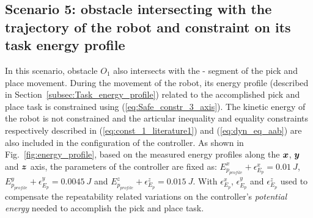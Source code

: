 \subsection{Scenario 5: obstacle intersecting with the trajectory of the robot and constraint on its task energy profile}
In this scenario, obstacle $O_1$ also intersects with the - segment of the pick and place movement. During the movement of the robot, its energy profile  (described in Section~\ref{subsec:Task_energy_profile}) related to the accomplished pick and place task is constrained using (\ref{eq:Safe_constr_3_axis}). The kinetic energy of the robot is not constrained and the articular inequality and equality constraints respectively described in (\ref{eq:const_1_literature1}) and (\ref{eq:dyn_eq_aab}) are also included in the configuration of the controller. As shown in Fig.~\ref{fig:energy_profile}, based on the measured energy profiles along the $\mbox{\boldmath${x}$}$, $\mbox{\boldmath${y}$}$ and $\mbox{\boldmath${z}$}$ axis, the  parameters of the controller are fixed as: $E_{p_{profile}}^{x}+\epsilon_{E_p}^{x} = 0.01~J$, $E_{p_{profile}}^{y}+\epsilon_{E_p}^{y} = 0.0045~J$ and $E_{p_{profile}}^{z}+\epsilon_{E_p}^{z} = 0.015~J$. With $\epsilon_{E_p}^{x}$, $\epsilon_{E_p}^{y}$ and $\epsilon_{E_p}^{z}$ used to compensate the repeatability related variations on the controller's \textit{potential energy} needed to accomplish the pick and place task.

